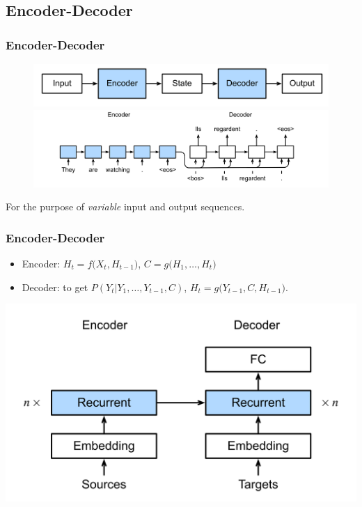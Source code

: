 \documentclass[]{beamer}
\begin{document}
\subsection{Encoder-Decoder}
\begin{frame}
    \frametitle{Encoder-Decoder}
    \begin{figure}
        \centering
        \includegraphics[scale=0.08]{encoder-decoder.png}
        \includegraphics[scale=0.10]{seq2seq.png}
    \end{figure}   
    \centering 
    For the purpose of \emph{variable} input and output sequences.
\end{frame}
\begin{frame}
    \frametitle{Encoder-Decoder}
    \begin{itemize}[label = \textbullet]
        \item Encoder: $H_t = f\bigl(X_t, H_{t-1}\bigr)$, $C = g\bigl(H_1, \ldots, H_t\bigr)$
        \item Decoder: to get $P(Y_t | Y_1, \ldots, Y_{t-1}, C)$, $H_t = g\bigl(Y_{t-1}, C, H_{t-1}\bigr)$.
    \end{itemize}
    \centering
    \includegraphics[scale = 0.1]{RNN-en-de.png}
\end{frame}
\end{document}
